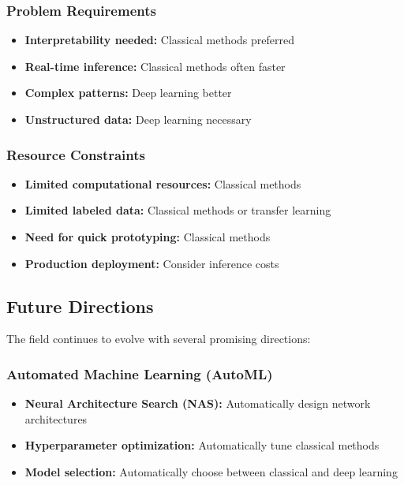 \subsubsection{Problem Requirements}
\begin{itemize}
    \item \textbf{Interpretability needed:} Classical methods preferred
    \item \textbf{Real-time inference:} Classical methods often faster
    \item \textbf{Complex patterns:} Deep learning better
    \item \textbf{Unstructured data:} Deep learning necessary
\end{itemize}

\subsubsection{Resource Constraints}
\begin{itemize}
    \item \textbf{Limited computational resources:} Classical methods
    \item \textbf{Limited labeled data:} Classical methods or transfer learning
    \item \textbf{Need for quick prototyping:} Classical methods
    \item \textbf{Production deployment:} Consider inference costs
\end{itemize}

\subsection{Future Directions}

The field continues to evolve with several promising directions:

\subsubsection{Automated Machine Learning (AutoML)}
\begin{itemize}
    \item \textbf{Neural Architecture Search (NAS):} Automatically design network architectures
    \item \textbf{Hyperparameter optimization:} Automatically tune classical methods
    \item \textbf{Model selection:} Automatically choose between classical and deep learning
\end{itemize}

